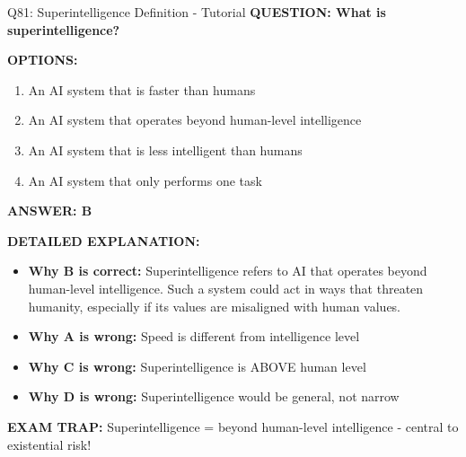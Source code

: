 \documentclass[8pt]{beamer}
\begin{document}
	\begin{frame}{Q81: Superintelligence Definition - Tutorial}
		\fontsize{6.5}{7.5}\selectfont
		\textbf{QUESTION: What is superintelligence?}
		
		\vspace{0.1cm}
		\textbf{OPTIONS:}
		\begin{enumerate}
			\item An AI system that is faster than humans
			\item An AI system that operates beyond human-level intelligence
			\item An AI system that is less intelligent than humans
			\item An AI system that only performs one task
		\end{enumerate}
		
		\vspace{0.1cm}
		\textcolor{myblue}{\textbf{ANSWER: B}}
		
		\vspace{0.1cm}
		\textbf{DETAILED EXPLANATION:}
		\begin{itemize}
			\item \textbf{Why B is correct:} Superintelligence refers to AI that operates beyond human-level intelligence. Such a system could act in ways that threaten humanity, especially if its values are misaligned with human values.
			\item \textbf{Why A is wrong:} Speed is different from intelligence level
			\item \textbf{Why C is wrong:} Superintelligence is ABOVE human level
			\item \textbf{Why D is wrong:} Superintelligence would be general, not narrow
		\end{itemize}
		
		\textcolor{myred}{\textbf{EXAM TRAP:}} Superintelligence = \textcolor{myblue}{beyond human-level intelligence} - central to existential risk!
	\end{frame}
	
\end{document}
